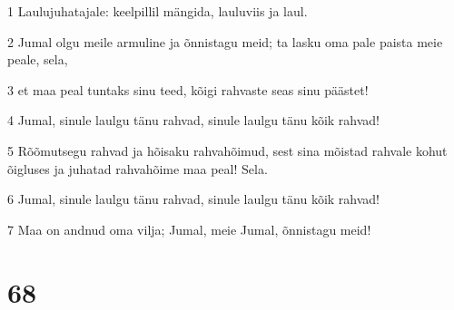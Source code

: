 \par 1 Laulujuhatajale: keelpillil mängida, lauluviis ja laul.
\par 2 Jumal olgu meile armuline ja õnnistagu meid; ta lasku oma pale paista meie peale, sela,
\par 3 et maa peal tuntaks sinu teed, kõigi rahvaste seas sinu päästet!
\par 4 Jumal, sinule laulgu tänu rahvad, sinule laulgu tänu kõik rahvad!
\par 5 Rõõmutsegu rahvad ja hõisaku rahvahõimud, sest sina mõistad rahvale kohut õigluses ja juhatad rahvahõime maa peal! Sela.
\par 6 Jumal, sinule laulgu tänu rahvad, sinule laulgu tänu kõik rahvad!
\par 7 Maa on andnud oma vilja; Jumal, meie Jumal, õnnistagu meid!

\chapter{68}

